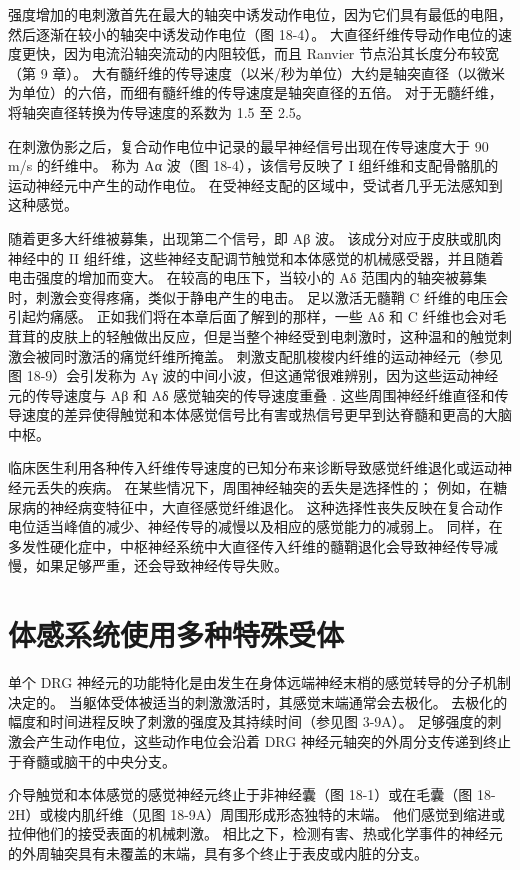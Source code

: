 强度增加的电刺激首先在最大的轴突中诱发动作电位，因为它们具有最低的电阻，然后逐渐在较小的轴突中诱发动作电位（图 18-4）。 大直径纤维传导动作电位的速度更快，因为电流沿轴突流动的内阻较低，而且 Ranvier 节点沿其长度分布较宽（第 9 章）。 大有髓纤维的传导速度（以米/秒为单位）大约是轴突直径（以微米为单位）的六倍，而细有髓纤维的传导速度是轴突直径的五倍。 对于无髓纤维，将轴突直径转换为传导速度的系数为 1.5 至 2.5。

在刺激伪影之后，复合动作电位中记录的最早神经信号出现在传导速度大于 90 m/s 的纤维中。 称为 Aα 波（图 18-4），该信号反映了 I 组纤维和支配骨骼肌的运动神经元中产生的动作电位。 在受神经支配的区域中，受试者几乎无法感知到这种感觉。

随着更多大纤维被募集，出现第二个信号，即 Aβ 波。 该成分对应于皮肤或肌肉神经中的 II 组纤维，这些神经支配调节触觉和本体感觉的机械感受器，并且随着电击强度的增加而变大。 在较高的电压下，当较小的 Aδ 范围内的轴突被募集时，刺激会变得疼痛，类似于静电产生的电击。 足以激活无髓鞘 C 纤维的电压会引起灼痛感。 正如我们将在本章后面了解到的那样，一些 Aδ 和 C 纤维也会对毛茸茸的皮肤上的轻触做出反应，但是当整个神经受到电刺激时，这种温和的触觉刺激会被同时激活的痛觉纤维所掩盖。 刺激支配肌梭梭内纤维的运动神经元（参见图 18-9）会引发称为 Aγ 波的中间小波，但这通常很难辨别，因为这些运动神经元的传导速度与 Aβ 和 Aδ 感觉轴突的传导速度重叠 . 这些周围神经纤维直径和传导速度的差异使得触觉和本体感觉信号比有害或热信号更早到达脊髓和更高的大脑中枢。

临床医生利用各种传入纤维传导速度的已知分布来诊断导致感觉纤维退化或运动神经元丢失的疾病。 在某些情况下，周围神经轴突的丢失是选择性的； 例如，在糖尿病的神经病变特征中，大直径感觉纤维退化。 这种选择性丧失反映在复合动作电位适当峰值的减少、神经传导的减慢以及相应的感觉能力的减弱上。 同样，在多发性硬化症中，中枢神经系统中大直径传入纤维的髓鞘退化会导致神经传导减慢，如果足够严重，还会导致神经传导失败。


\section{体感系统使用多种特殊受体}
单个 DRG 神经元的功能特化是由发生在身体远端神经末梢的感觉转导的分子机制决定的。 当躯体受体被适当的刺激激活时，其感觉末端通常会去极化。 去极化的幅度和时间进程反映了刺激的强度及其持续时间（参见图 3-9A）。 足够强度的刺激会产生动作电位，这些动作电位会沿着 DRG 神经元轴突的外周分支传递到终止于脊髓或脑干的中央分支。

介导触觉和本体感觉的感觉神经元终止于非神经囊（图 18-1）或在毛囊（图 18-2H）或梭内肌纤维（见图 18-9A）周围形成形态独特的末端。 他们感觉到缩进或拉伸他们的接受表面的机械刺激。 相比之下，检测有害、热或化学事件的神经元的外周轴突具有未覆盖的末端，具有多个终止于表皮或内脏的分支。

